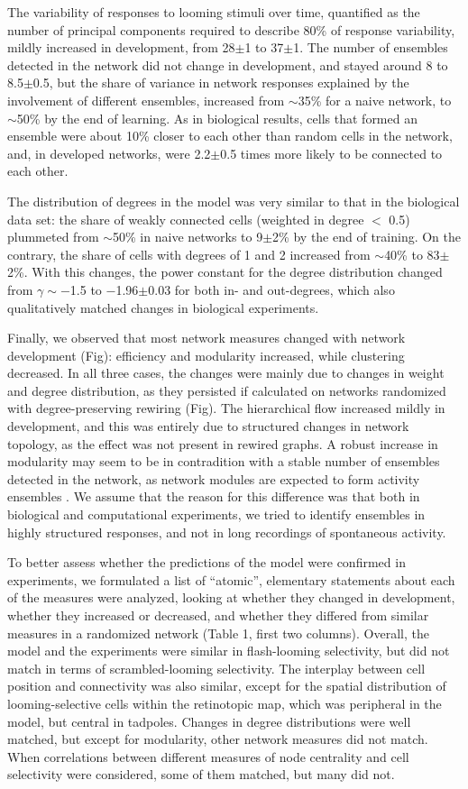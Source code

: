 \documentclass{article}
\begin{document}
The variability of responses to looming stimuli over time, quantified as the number of principal components required to describe 80\% of response variability, mildly increased in development, from 28$\pm$1 to 37$\pm$1. The number of ensembles detected in the network did not change in development, and stayed around 8 to 8.5$\pm$0.5, but the share of variance in network responses explained by the involvement of different ensembles, increased from $\sim$35\% for a naive network, to $\sim$50\% by the end of learning. As in biological results, cells that formed an ensemble were about 10\% closer to each other than random cells in the network, and, in developed networks, were 2.2$\pm$0.5 times more likely to be connected to each other.

The distribution of degrees in the model was very similar to that in the biological data set: the share of weakly connected cells (weighted in degree $<$ 0.5) plummeted from $\sim$50\% in naive networks to 9$\pm$2\% by the end of training. On the contrary, the share of cells with degrees of 1 and 2 increased from $\sim$40\% to 83$\pm$2\%. With this changes, the power constant for the degree distribution changed from $\gamma \sim -$1.5 to $-$1.96$\pm$0.03 for both in- and out-degrees, which also qualitatively matched changes in biological experiments.

Finally, we observed that most network measures changed with network development (Fig): efficiency and modularity increased, while clustering decreased. In all three cases, the changes were mainly due to changes in weight and degree distribution, as they persisted if calculated on networks randomized with degree-preserving rewiring (Fig). The hierarchical flow increased mildly in development, and this was entirely due to structured changes in network topology, as the effect was not present in rewired graphs. A robust increase in modularity may seem to be in contradition with a stable number of ensembles detected in the network, as network modules are expected to form activity ensembles \citep{triplett2018emergence}. We assume that the reason for this difference was that both in biological and computational experiments, we tried to identify ensembles in highly structured responses, and not in long recordings of spontaneous activity.

To better assess whether the predictions of the model were confirmed in experiments, we formulated a list of “atomic”, elementary statements about each of the measures were analyzed, looking at whether they changed in development, whether they increased or decreased, and whether they differed from similar measures in a randomized network (Table 1, first two columns). Overall, the model and the experiments were similar in flash-looming selectivity, but did not match in terms of scrambled-looming selectivity. The interplay between cell position and connectivity was also similar, except for the spatial distribution of looming-selective cells within the retinotopic map, which was peripheral in the model, but central in tadpoles. Changes in degree distributions were well matched, but except for modularity, other network measures did not match. When correlations between different measures of node centrality and cell selectivity were considered, some of them matched, but many did not.
\end{document}
